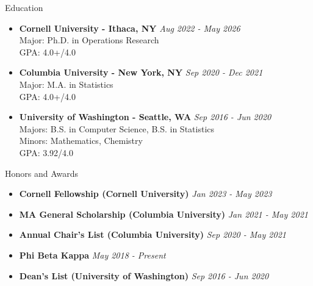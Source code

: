 \documentclass{resume} %
\begin{document}

\begin{rSection}{Education}
\begin{itemize}
\item {\bf Cornell University - Ithaca, NY} \hfill {\em Aug 2022 - May 2026}\\
Major: Ph.D. in Operations Research\\
GPA: 4.0+/4.0
\item {\bf Columbia University - New York, NY} \hfill {\em Sep 2020 - Dec 2021}\\
Major: M.A. in Statistics\\
GPA: 4.0+/4.0
\item {\bf University of Washington - Seattle, WA} \hfill {\em Sep 2016 - Jun 2020}\\
Majors: B.S. in Computer Science, B.S. in Statistics\\
Minors: Mathematics, Chemistry\\
GPA: 3.92/4.0
\end{itemize}
\end{rSection}

\begin{rSection}{Honors and Awards}
\begin{itemize}
\item {\bf Cornell Fellowship (Cornell University)} \hfill {\em Jan 2023 - May 2023}
\item {\bf MA General Scholarship (Columbia University)} \hfill {\em Jan 2021 - May 2021}
\item {\bf Annual Chair's List (Columbia University)} \hfill {\em Sep 2020 - May 2021}
\item {\bf Phi Beta Kappa} \hfill {\em May 2018 - Present}
\item {\bf Dean's List (University of Washington)} \hfill {\em Sep 2016 - Jun 2020}
\end{itemize}
\end{rSection}
\end{document}
